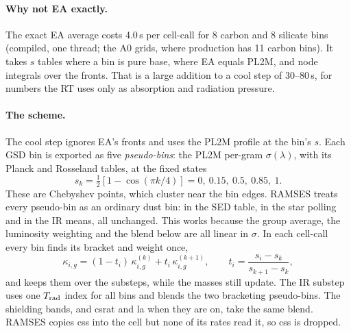 \documentclass[11pt,a4paper]{article}
\begin{document}
\paragraph{Why not EA exactly.} The exact EA average costs 4.0\,\textmu s per cell-call for 8 carbon and 8 silicate bins
(compiled, one thread; the A0 grids, where production has 11 carbon bins). It takes $s$ tables where a bin is pure base, where EA equals PL2M, and node integrals over the
fronts. That is a large addition to a cool step of 30--80\,\textmu s, for numbers the RT uses only as absorption and
radiation pressure.

\paragraph{The scheme.} The cool step ignores EA's fronts and uses the PL2M profile at the bin's $s$. Each GSD bin is
exported as five \emph{pseudo-bins}: the PL2M per-gram $\sigma(\lambda)$, with its Planck and Rosseland tables, at the
fixed states
\begin{equation}
s_k = \tfrac12\left[1 - \cos(\pi k/4)\right] = 0,\ 0.15,\ 0.5,\ 0.85,\ 1 .
\end{equation}
These are Chebyshev points, which cluster near the bin edges. RAMSES treats every pseudo-bin as an ordinary dust bin:
in the SED table, in the star polling and in the IR means, all unchanged. This works because the group average, the
luminosity weighting and the blend below are all linear in $\sigma$. In each cell-call every bin finds its bracket and
weight once,
\begin{equation}
\kappa_{i,g} = (1-t_i)\,\kappa^{(k)}_{i,g} + t_i\,\kappa^{(k+1)}_{i,g}, \qquad t_i = \frac{s_i - s_k}{s_{k+1}-s_k},
\end{equation}
and keeps them over the substeps, while the masses still update. The IR substep uses one $T_{\rm rad}$ index for all
bins and blends the two bracketing pseudo-bins. The shielding bands, and csrat and la when they are on, take the same
blend. RAMSES copies css into the cell but none of its rates read it, so css is dropped.
\end{document}
